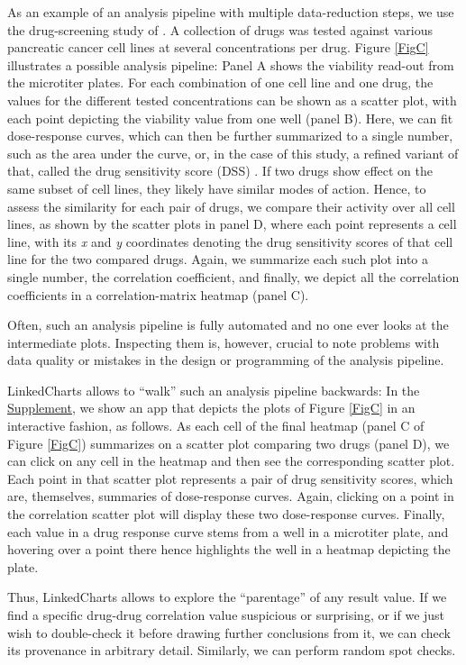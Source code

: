 \documentclass[twocolumn,10pt]{article}
\newcommand{\Supplement}{\href{https://anders-biostat.github.io/lc-paper/}{Supplement}}
\begin{document}
As an example of an analysis pipeline with multiple data-reduction steps, we use the drug-screening study of \citet{ozkan_2020}. A collection of drugs was tested against various pancreatic cancer cell lines at several concentrations per drug. Figure \ref{FigC} illustrates a possible analysis pipeline: Panel A shows the viability read-out from the microtiter plates. For each combination of one cell line and one drug, the values for the different tested concentrations can be shown as a scatter plot, with each point depicting the viability value from one well (panel B). Here, we can fit dose-response curves, which can then be further summarized to a single number, such as the area under the curve, or, in the case of this study, a refined variant of that, called the drug sensitivity score (DSS) \citep{yadav_2014}. If two drugs show effect on the same subset of cell lines, they likely have similar modes of action. Hence, to assess the similarity for each pair of drugs, we compare their activity over all cell lines, as shown by the scatter plots in panel D, where each point represents a cell line, with its \emph{x} and \emph{y} coordinates denoting the drug sensitivity scores of that cell line for the two compared drugs. Again, we summarize each such plot into a single number, the correlation coefficient, and finally, we depict all the correlation coefficients in a correlation-matrix heatmap (panel C).

Often, such an analysis pipeline is fully automated and no one ever looks at the intermediate plots. Inspecting them is, however, crucial to note problems with data quality or mistakes in the design or programming of the analysis pipeline.

LinkedCharts allows to ``walk'' such an analysis pipeline backwards: In the \Supplement, we show an app that depicts the plots of Figure \ref{FigC} in an interactive fashion, as follows. As each cell of the final heatmap (panel C of Figure \ref{FigC}) summarizes on a scatter plot comparing two drugs (panel D), we can click on any cell in the heatmap and then see the corresponding scatter plot. Each point in that scatter plot represents a pair of drug sensitivity scores, which are, themselves, summaries of dose-response curves. Again, clicking on a point in the correlation scatter plot will display these two dose-response curves. Finally, each value in a drug response curve stems from a well in a microtiter plate, and hovering over a point there hence highlights the well in a heatmap depicting the plate.

Thus, LinkedCharts allows to explore the ``parentage'' of any result value. If we find a specific drug-drug correlation value suspicious or surprising, or if we just wish to double-check it before drawing further conclusions from it, we can check its provenance in arbitrary detail. Similarly, we can perform random spot checks. 
\end{document}

